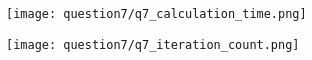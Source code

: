 \documentclass[uplatex,a4j]{jsarticle}
\begin{document}
\begin{figure}[htbp]
  \centering

  \begin{minipage}[t]{0.48\textwidth}
    \centering
    \texttt{[image: question7/q7\_calculation\_time.png]}
    \label{fig:q7_ct}
  \end{minipage}
  \hfill
  \begin{minipage}[t]{0.48\textwidth}
    \centering
    \texttt{[image: question7/q7\_iteration\_count.png]}
    \label{fig:q7_ic}
  \end{minipage}
  
\end{figure}
\end{document}

